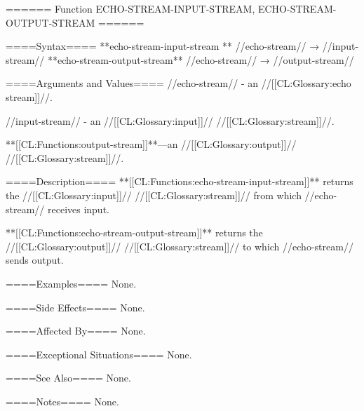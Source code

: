 ====== Function ECHO-STREAM-INPUT-STREAM, ECHO-STREAM-OUTPUT-STREAM ======

====Syntax====
**echo-stream-input-stream ** //echo-stream// → //input-stream// **echo-stream-output-stream** //echo-stream// → //output-stream//

====Arguments and Values====
//echo-stream// - an //[[CL:Glossary:echo stream]]//.

//input-stream// - an //[[CL:Glossary:input]]// //[[CL:Glossary:stream]]//.

**[[CL:Functions:output-stream]]**---an //[[CL:Glossary:output]]// //[[CL:Glossary:stream]]//.

====Description====
**[[CL:Functions:echo-stream-input-stream]]** returns the //[[CL:Glossary:input]]// //[[CL:Glossary:stream]]// from which //echo-stream// receives input.

**[[CL:Functions:echo-stream-output-stream]]** returns the //[[CL:Glossary:output]]// //[[CL:Glossary:stream]]// to which //echo-stream// sends output.

====Examples====
None.

====Side Effects====
None.

====Affected By====
None.

====Exceptional Situations====
None.

====See Also====
None.

====Notes====
None.

